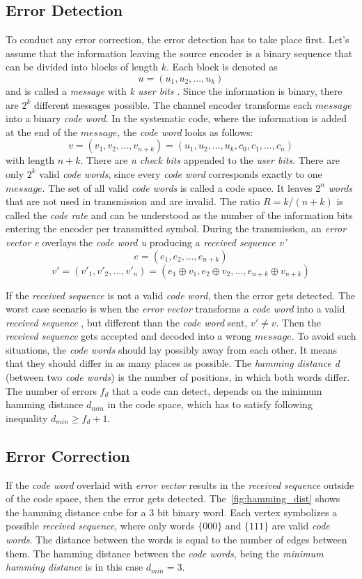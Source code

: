\subsection{Error Detection}
To conduct any error correction, the error detection has to take place first. Let's assume that the information leaving the source encoder is a binary sequence that can be divided into blocks of length $k$. Each block is denoted as 
$$u=(u_1,u_2,...,u_k)$$ 
and is called a \textit{message} with \textit{k user bits} . Since the information is binary, there are $2^k$ different messages possible. The channel encoder transforms each $message$ into a binary \textit{code word}. In the systematic code, where the information is added at the end of the $message$, the \textit{code word} looks as follows:
$$v=(v_1,v_2,...,v_{n+k}) = (u_1,u_2,...,u_k, c_0,c_1,...,c_{n})$$ 
with length $n+k$. There are \textit{n check bits} appended to the \textit{user bits}. There are only $2^k$ valid \textit{code words}, since every \textit{code word} corresponds exactly to one $message$. The set of all valid \textit{code words} is called a code space. It leaves $2^n$ \textit{words} that are not used in transmission and are invalid. The ratio $R=k/(n+k)$ is called the \textit{code rate} and can be understood as the number of the information bits entering the encoder per transmitted symbol. During the transmission, an \textit{error vector e} overlays the \textit{code word u} producing a \textit{received sequence v'} 
$$e=(e_1,e_2,...,e_{n+k})$$ 
$$v'=(v'_1,v'_2,...,v'_n)= (e_1 \oplus v_1, e_2 \oplus v_2,...,e_{n+k} \oplus v_{n+k})$$

If the \textit{received sequence} is not a valid \textit{code word}, then the error gets detected. The worst case scenario is when the \textit{error vector} transforms a \textit{code word} into a valid \textit{received sequence} , but different than the \textit{code word} sent, $v'\neq v$. Then the \textit{received sequence} gets accepted and decoded into a wrong $message$. To avoid such situations, the \textit{code words} should lay possibly away from each other. It means that they should differ in as many places as possible. The \textit{hamming distance d} (between two \textit{code words}) is the number of positions, in which both words differ. The number of errors $f_d$ that a code can detect, depends on the minimum hamming distance $d_{min}$ in the code space, which has to satisfy following inequality $d_{min} \geq f_d + 1$.
\subsection{Error Correction}
If the \textit{code word} overlaid with \textit{error vector} results in the \textit{received sequence} outside of the code space, then the error gets detected. The~\autoref{fig:hamming_dist} shows the hamming distance cube for a 3 bit binary word. Each vertex symbolizes a possible \textit{received sequence}, where only words $\{000\}$ and $\{111\}$ are valid \textit{code words}. The distance between the words is equal to the number of edges between them. The hamming distance between the \textit{code words}, being the \textit{minimum hamming distance} is in this case $d_{min}=3$.

